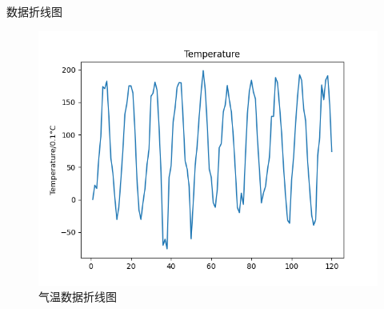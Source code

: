 \documentclass[10pt]{beamer}
\begin{document}
\begin{frame}
\begin{block}{数据折线图}
		\begin{figure}[h!]
			\centering
			\includegraphics[scale=0.21]{../src/prepare_data/tg.png}
			\caption{气温数据折线图}
		\end{figure}
	\end{block}
\end{frame}
\end{document}
